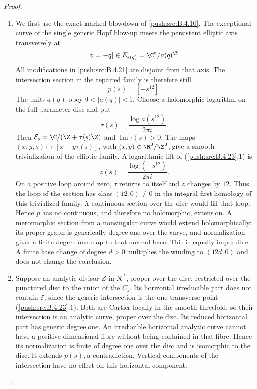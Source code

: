 \begin{proof}
\begin{enumerate}[label=\arabic*.,leftmargin=*]
\item We first use the exact marked blowdown of \ref{push:src:B.4.10}.
The exceptional curve of the single generic Hopf blow-up
meets the persistent elliptic axis transversely at
\[
 [v=-q]\in E_{a(q)}=\C^*/a(q)^{\Z}.
\]
All modifications in \ref{push:src:B.4.21} are disjoint from that axis.
The intersection section in the repaired family is therefore
still
\[
 p(s)=[-s^{12}].                                      \tag{B.4.23.1}
\]
The units $a(q)$ obey $0<|a(q)|<1$. Choose a holomorphic
logarithm on the full parameter disc and put
\[
 \tau(s)=\frac{\log a(s^{12})}{2\pi i}.
\]
Then $\mathcal E_s=\C/(\Z+\tau(s)\Z)$ and
$\operatorname{Im}\tau(s)>0$. The maps
$(x,y,s)\mapsto[x+y\tau(s)]$, with $(x,y)\in\R^2/\Z^2$,
give a smooth trivialization of the elliptic family.
A logarithmic lift of (\ref{push:src:B.4.23}.1) is
\[
 z(s)=\frac{\log(-s^{12})}{2\pi i}.
\]
On a positive loop around zero, $\tau$ returns to itself
and $z$ changes by $12$. Thus the loop of the section has
class $(12,0)\ne0$ in the integral first homology of this
trivialized family. A continuous section over the disc
would fill that loop. Hence $p$ has no continuous, and
therefore no holomorphic, extension. A meromorphic section
from a nonsingular curve would extend holomorphically:
its proper graph is generically degree one over the curve,
and normalization gives a finite degree-one map to that
normal base. This is equally impossible. A finite base
change of degree $d>0$ multiplies the winding to $(12d,0)$
and does not change the conclusion.

\item Suppose an analytic divisor $Z$ in $\mathcal K^*$, proper
over the disc, restricted over the punctured disc to the
union of the $C_s$. Its horizontal irreducible part does
not contain $\mathcal E$, since the generic intersection
is the one transverse point (\ref{push:src:B.4.23}.1). Both are Cartier
locally in the smooth threefold, so their intersection
is an analytic curve, proper over the disc. Its reduced
horizontal part has generic degree one. An irreducible
horizontal analytic curve cannot have a positive-dimensional
fibre without being contained in that fibre. Hence its
normalization is finite of degree one over the disc and
is isomorphic to the disc. It extends $p(s)$, a
contradiction. Vertical components of the intersection
have no effect on this horizontal component.


\end{enumerate}
\end{proof}
